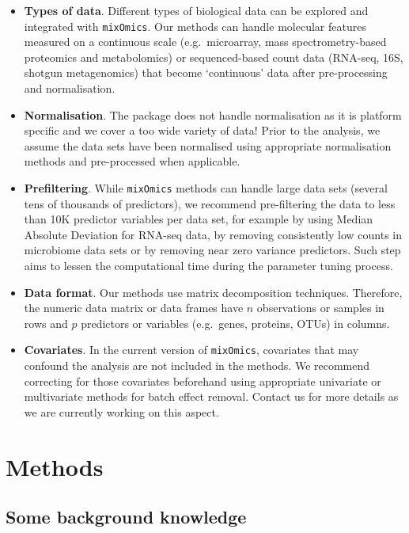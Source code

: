 \documentclass[]{book}
\theoremstyle{definition}
\theoremstyle{definition}
\theoremstyle{definition}
\theoremstyle{remark}
\begin{document}
\begin{itemize}
\item
  \textbf{Types of data}. Different types of biological data can be
  explored and integrated with \texttt{mixOmics}. Our methods can handle
  molecular features measured on a continuous scale (e.g.~microarray,
  mass spectrometry-based proteomics and metabolomics) or
  sequenced-based count data (RNA-seq, 16S, shotgun metagenomics) that
  become `continuous' data after pre-processing and normalisation.
\item
  \textbf{Normalisation}. The package does not handle normalisation as
  it is platform specific and we cover a too wide variety of data! Prior
  to the analysis, we assume the data sets have been normalised using
  appropriate normalisation methods and pre-processed when applicable.
\item
  \textbf{Prefiltering}. While \texttt{mixOmics} methods can handle
  large data sets (several tens of thousands of predictors), we
  recommend pre-filtering the data to less than 10K predictor variables
  per data set, for example by using Median Absolute Deviation
  \citep{Ten16} for RNA-seq data, by removing consistently low counts in
  microbiome data sets \citep{Lec16} or by removing near zero variance
  predictors. Such step aims to lessen the computational time during the
  parameter tuning process.
\item
  \textbf{Data format}. Our methods use matrix decomposition techniques.
  Therefore, the numeric data matrix or data frames have \(n\)
  observations or samples in rows and \(p\) predictors or variables
  (e.g.~genes, proteins, OTUs) in columns.
\item
  \textbf{Covariates}. In the current version of \texttt{mixOmics},
  covariates that may confound the analysis are not included in the
  methods. We recommend correcting for those covariates beforehand using
  appropriate univariate or multivariate methods for batch effect
  removal. Contact us for more details as we are currently working on
  this aspect.
\end{itemize}

\section{Methods}\label{methods}

\subsection{Some background knowledge}\label{intro:background}
\end{document}
